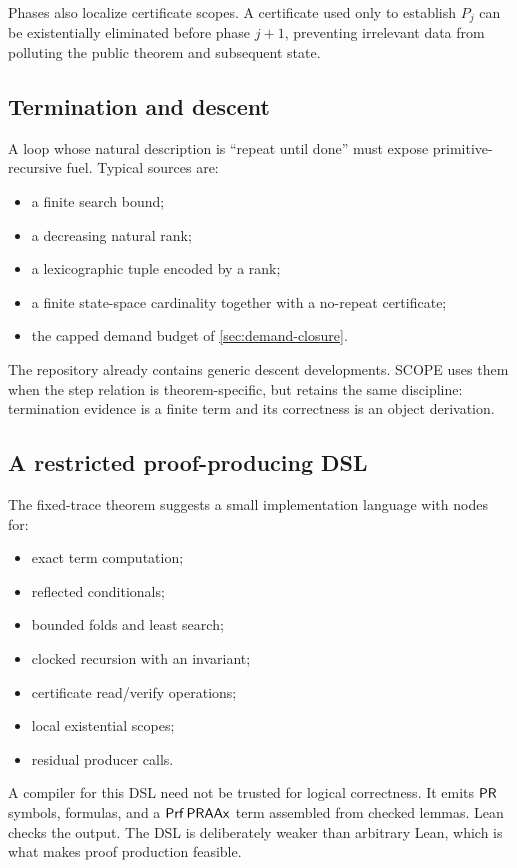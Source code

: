 Phases also localize certificate scopes.  A certificate used only to establish \(P_j\) can be existentially eliminated before phase \(j+1\), preventing irrelevant data from polluting the public theorem and subsequent state.

\subsection{Termination and descent}

A loop whose natural description is ``repeat until done'' must expose primitive-recursive fuel.  Typical sources are:

\begin{itemize}
\item a finite search bound;
\item a decreasing natural rank;
\item a lexicographic tuple encoded by a rank;
\item a finite state-space cardinality together with a no-repeat certificate;
\item the capped demand budget of \cref{sec:demand-closure}.
\end{itemize}

The repository already contains generic descent developments.  SCOPE uses them when the step relation is theorem-specific, but retains the same discipline: termination evidence is a finite term and its correctness is an object derivation.

\subsection{A restricted proof-producing DSL}

The fixed-trace theorem suggests a small implementation language with nodes for:

\begin{itemize}
\item exact term computation;
\item reflected conditionals;
\item bounded folds and least search;
\item clocked recursion with an invariant;
\item certificate read/verify operations;
\item local existential scopes;
\item residual producer calls.
\end{itemize}

A compiler for this DSL need not be trusted for logical correctness.  It emits \(\mathsf{PR}\) symbols, formulas, and a \(\mathsf{Prf}\,\mathsf{PRAAx}\) term assembled from checked lemmas.  Lean checks the output.  The DSL is deliberately weaker than arbitrary Lean, which is what makes proof production feasible.
